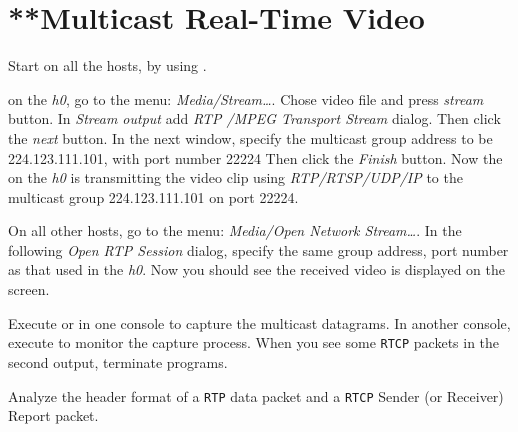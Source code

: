 \documentclass{../UTNetLab}
\begin{document}
\section{**Multicast Real-Time Video}
Start  on all the hosts, by using .

on the \textit{h0}, go to the  menu: \textit{Media/Stream\ldots }.
Chose video file  and press \textit{stream} button.
In \textit{Stream output} add \textit{RTP /MPEG Transport Stream} dialog.
Then click the \textit{next} button.
In the next window, specify the multicast group address to be {224.123.111.101}, with port number {22224} %
Then click the \textit{Finish} button.
Now the  on the \textit{h0} is transmitting the video clip using \textit{RTP/RTSP/UDP/IP} to the multicast group {224.123.111.101} on port {22224}.

On all other hosts, go to the  menu: \textit{Media/Open Network Stream\ldots}.
In the following \textit{Open RTP Session} dialog, specify the same group address, port number as that used in the \textit{h0}.%
Now you should see the received video is displayed on the screen.

Execute  or  in one console to capture the multicast datagrams.
In another console, execute  to monitor the capture process.
When you see some \texttt{RTCP} packets in the second  output, terminate  programs.

Analyze the header format of a \texttt{RTP} data packet and a \texttt{RTCP} Sender (or Receiver) Report packet.
\end{document}
